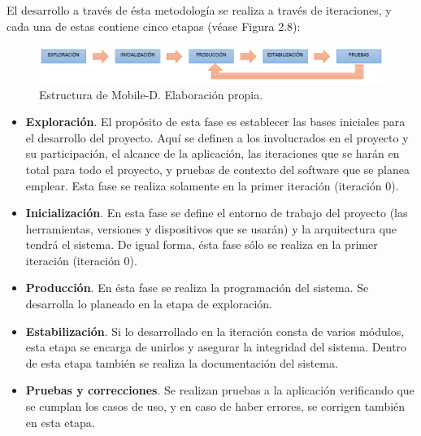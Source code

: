 El desarrollo a través de ésta metodología se realiza a través de iteraciones, y cada una de estas contiene cinco etapas (véase Figura 2.8):
\begin{figure}[h!]
	\centering
	\includegraphics[width=16cm]{imagenes/marcoteorico/mobiled.png}
	\caption{Estructura de Mobile-D. Elaboración propia.}
	\label{fig:mobiled}
\end{figure}
\begin{itemize}
	\item \textbf{Exploración}. El propósito de esta fase es establecer las bases iniciales para el desarrollo del proyecto. Aquí se definen a los involucrados en el proyecto y su participación, el alcance de la aplicación, las iteraciones que se harán en total para todo el proyecto, y pruebas de contexto del software que se planea emplear. Esta fase se realiza solamente en la primer iteración (iteración 0).
	\item \textbf{Inicialización}. En esta fase se define el entorno de trabajo del proyecto (las herramientas, versiones y dispositivos que se usarán) y la arquitectura que tendrá el sistema. De igual forma, ésta fase sólo se realiza en la primer iteración (iteración 0).
	\item \textbf{Producción}. En ésta fase se realiza la programación del sistema. Se desarrolla lo planeado en la etapa de exploración.
	\item \textbf{Estabilización}. Si lo desarrollado en la iteración consta de varios módulos, esta etapa se encarga de unirlos y asegurar la integridad del sistema. Dentro de esta etapa también se realiza la documentación del sistema.
	\item \textbf{Pruebas y correcciones}. Se realizan pruebas a la aplicación verificando que se cumplan los casos de uso, y en caso de haber errores, se corrigen también en esta etapa.
\end{itemize}


